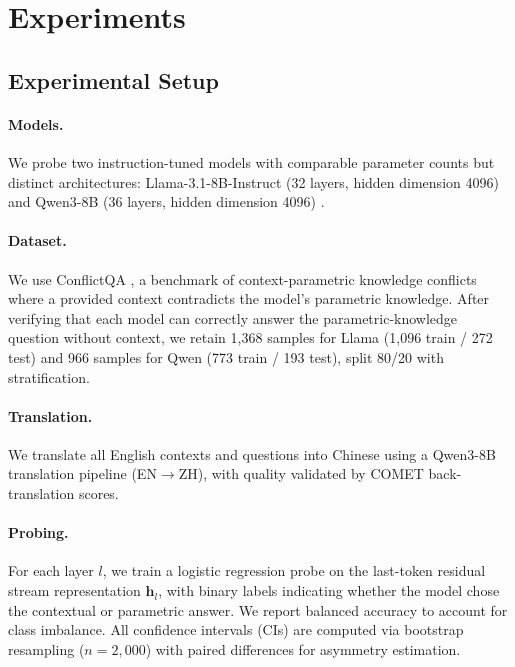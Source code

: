 \section{Experiments}
\label{sec:experiments}

\subsection{Experimental Setup}
\label{sec:setup}

\paragraph{Models.}
We probe two instruction-tuned models with comparable parameter counts but distinct architectures: Llama-3.1-8B-Instruct (32 layers, hidden dimension 4096) \citep{grattafiori2024llama} and Qwen3-8B (36 layers, hidden dimension 4096) \citep{yang2024qwen25}.

\paragraph{Dataset.}
We use ConflictQA \citep{xie2024adaptive}, a benchmark of context-parametric knowledge conflicts where a provided context contradicts the model's parametric knowledge.
After verifying that each model can correctly answer the parametric-knowledge question without context, we retain 1{,}368 samples for Llama (1{,}096 train / 272 test) and 966 samples for Qwen (773 train / 193 test), split 80/20 with stratification.

\paragraph{Translation.}
We translate all English contexts and questions into Chinese using a Qwen3-8B translation pipeline (EN$\to$ZH), with quality validated by COMET \citep{rei2020comet} back-translation scores.

\paragraph{Probing.}
For each layer $l$, we train a logistic regression probe on the last-token residual stream representation $\mathbf{h}_l$, with binary labels indicating whether the model chose the contextual or parametric answer.
We report balanced accuracy to account for class imbalance.
All confidence intervals (CIs) are computed via bootstrap resampling ($n = 2{,}000$) with paired differences for asymmetry estimation.


